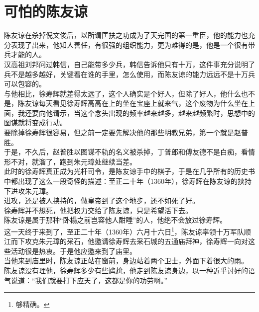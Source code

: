 \section{可怕的陈友谅}
\ifnum{}
	\begin{multicols}{\theparacolNo}
\fi
陈友谅在杀掉倪文俊后，以所谓匡扶之功成为了天完国的第一重臣，他的能力也充分表现了出来，他知人善任，有很强的组织能力，更为难得的是，他是一个很有带兵才能的人。\\

汉高祖刘邦问过韩信，自己能带多少兵，韩信告诉他只有十万，这件事充分说明了兵不是越多越好，关键看在谁的手里，怎么使用，而陈友谅的能力远远不是十万兵可以包容的。\\

与他相比，徐寿辉就差得太远了，这个人确实是个好人，但除了好人，他什么也不是，陈友谅每天看见徐寿辉高高在上的坐在宝座上就来气，这个废物为什么坐在上面，我还要向他请示，当这个念头出现的频率越来越多，越来越频繁时，思想中的图谋就将变成行动。\\

要除掉徐寿辉很容易，但之前一定要先解决他的那些明教兄弟，第一个就是赵普胜。\\

于是，不久后，赵普胜以图谋不轨的名义被杀掉，丁普郎和傅友德不是白痴，看情形不对，就溜了，跑到朱元璋处继续当差。\\

此时的徐寿辉真正成为光杆司令，是陈友谅手中的棋子，于是在几乎所有的历史书中都出现了这么一段奇怪的描述：至正二十年（1360年），徐寿辉在陈友谅的挟持下进攻朱元璋。\\

进攻，还是被人挟持的，做皇帝到了这个地步，还不如死了好。\\

徐寿辉并不想死，他把权力交给了陈友谅，只是希望活下去。\\

陈友谅是属于那种“卧榻之前岂容他人酣睡”的人，他绝不会放过徐寿辉。\\

这一天终于来到了，至正二十年（1360年）六月十六日\footnote{够精确。}，陈友谅率领十万军队顺江而下攻克朱元璋的采石，他邀请徐寿辉去采石城的五通庙拜神，徐寿辉一向对这些活动很是热衷。于是他应邀来到了庙里。\\

当他来到庙里时，陈友谅正站在窗前，身边站着两个卫士，外面下着很大的雨。\\

陈友谅没有理他，徐寿辉多少有些尴尬，他走到陈友谅身边，以一种近乎讨好的语气说道：“我们就要打下应天了，这都是你的功劳啊。”\\


\end{multicols}
